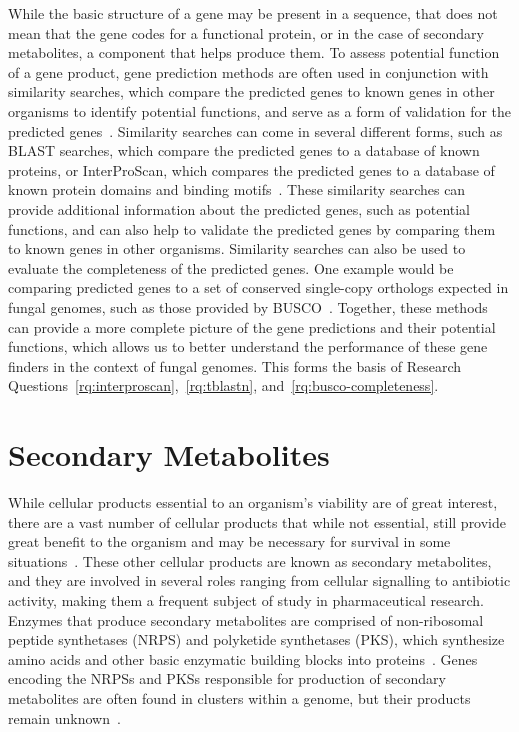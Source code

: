 While the basic structure of a gene may be present in a sequence, that does not mean that the gene codes for a functional protein, or in the case of secondary metabolites, a component that helps produce them. To assess potential function of a gene product, gene prediction methods are often used in conjunction with similarity searches, which compare the predicted genes to known genes in other organisms to identify potential functions, and serve as a form of validation for the predicted genes~\cite{loftus2003a}. 
Similarity searches can come in several different forms, such as BLAST searches, which compare the predicted genes to a database of known proteins, or InterProScan, which compares the predicted genes to a database of known protein domains and binding motifs~\cite{loftus2003a}. These similarity searches can provide additional information about the predicted genes, such as potential functions, and can also help to validate the predicted genes by comparing them to known genes in other organisms. Similarity searches can also be used to evaluate the completeness of the predicted genes. One example would be comparing predicted genes to a set of conserved single-copy orthologs expected in fungal genomes, such as those provided by BUSCO~\cite{manni2021a}. Together, these methods can provide a more complete picture of the gene predictions and their potential functions, which allows us to better understand the performance of these gene finders in the context of fungal genomes. This forms the basis of Research Questions~\ref{rq:interproscan},~\ref{rq:tblastn}, and~\ref{rq:busco-completeness}.

\section{Secondary Metabolites}
\label{lit:secondary-metabolites}

While cellular products essential to an organism's viability are
of great interest, there are a vast number of cellular products that while not
essential, still provide great benefit to the
organism and may be necessary for survival in some situations~\cite{Craney2013, Mukherjee2012}. These other cellular products are known
 as secondary metabolites, and they are involved in several roles ranging 
 from cellular signalling to antibiotic activity, making them a frequent 
 subject of study in pharmaceutical research. Enzymes that produce 
 secondary metabolites are comprised of non-ribosomal peptide synthetases 
 (NRPS) and polyketide synthetases (PKS), which synthesize amino acids and 
 other basic enzymatic building blocks into proteins~\cite{komaki2020}. 
 Genes encoding the NRPSs and PKSs responsible for production of secondary 
 metabolites are often found in clusters within a genome, but their 
 products remain unknown~\cite{Mukherjee2012}. 
 
